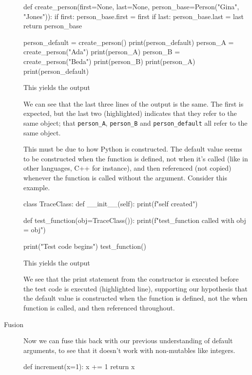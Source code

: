 \begin{description}
\begin{pyblock}[default1][highlightlines={10-12}]
def create_person(first=None, last=None,
                  person_base=Person("Gina", "Jones")):
  if first: person_base.first = first
  if last: person_base.last = last
  return person_base

person_default = create_person()
print(person_default)
person_A = create_person("Ada")
print(person_A)
person_B = create_person("Beda")
print(person_B)
print(person_A)
print(person_default)
    \end{pyblock}
    \vspace{0.5em}
    This yields the output
    \vspace{0.5em}
    \printpythontex[verbatim][highlightlines={4-5}]

    We can see that the last three lines of the output is the same.
    The first is expected, but the last two (highlighted) indicates that they 
    refer to the same object; \ie that \texttt{person_A}, 
    \texttt{person_B} and \texttt{person_default} all 
    refer to the same object.

    This must be due to how Python is constructed.
    The default value seems to be constructed when the function is defined, not 
    when it's called (like in other languages, C++ for instance), and then 
    referenced (not copied) whenever the function is called without the 
    argument.
    Consider this example.

    \begin{pyblock}[default1][highlightlines=5]
class TraceClass:
  def __init__(self):
    print(f"{self} created")

def test_function(obj=TraceClass()):
  print(f"test_function called with obj = {obj}")

print("Test code begins")
test_function()
    \end{pyblock}
    \vspace{0.5em}
    This yields the output
    \vspace{0.5em}
    \printpythontex[verbatim][highlightlines={1}]

    We see that the print statement from the constructor is executed before the 
    test code is executed (highlighted line), supporting our hypothesis that 
    the default value is constructed when the function is defined, not the when 
    function is called, and then referenced throughout.

  \item[Fusion] Now we can fuse this back with our previous understanding of 
    default arguments, to see that it doesn't work with non-mutables like 
    integers.
    \begin{pyblock}[default1]
def increment(x=1):
  x += 1
  return x


\end{pyblock}
\end{description}
